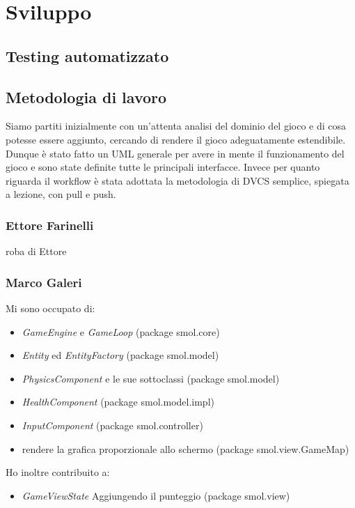 \documentclass[a4paper,12pt]{report}
\begin{document}
\chapter{Sviluppo}

\section{Testing automatizzato}

\section{Metodologia di lavoro}

Siamo partiti inizialmente con un'attenta analisi del dominio del gioco e di cosa potesse essere aggiunto, cercando di rendere il gioco adeguatamente estendibile.
Dunque è stato fatto un UML generale per avere in mente il funzionamento del gioco e sono state definite tutte le principali interfacce.
Invece per quanto riguarda il workflow è stata adottata la metodologia di DVCS semplice, spiegata a lezione, con pull e push.

\subsection*{Ettore Farinelli}
roba di Ettore
\subsection*{Marco Galeri}

Mi sono occupato di:
\begin{itemize}
    \item \emph{GameEngine} e \emph{GameLoop} (package smol.core)
    \item \emph{Entity} ed \emph{EntityFactory} (package smol.model)
    \item \emph{PhysicsComponent} e le sue sottoclassi (package smol.model)
    \item \emph{HealthComponent} (package smol.model.impl)
    \item \emph{InputComponent} (package smol.controller)
    \item rendere la grafica proporzionale allo schermo (package smol.view.GameMap)
\end{itemize}

Ho inoltre contribuito a:
\begin{itemize}
    \item \emph{GameViewState} Aggiungendo il punteggio (package smol.view)
\end{itemize}
\end{document}
